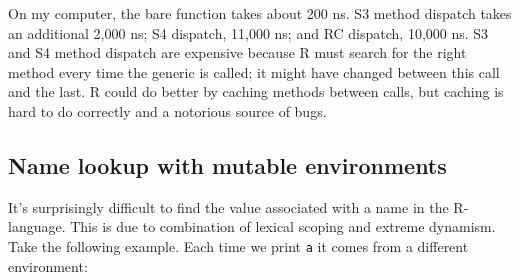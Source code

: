 \begin{Shaded}
\begin{Highlighting}[]
\NormalTok{(}
   \NormalTok{(),}
   
   
   \NormalTok{()}
\NormalTok{)}
\end{Highlighting}
\end{Shaded}

On my computer, the bare function takes about 200 ns. S3 method dispatch
takes an additional 2,000 ns; S4 dispatch, 11,000 ns; and RC dispatch,
10,000 ns. S3 and S4 method dispatch are expensive because R must search
for the right method every time the generic is called; it might have
changed between this call and the last. R could do better by caching
methods between calls, but caching is hard to do correctly and a
notorious source of bugs.

\subsection{Name lookup with mutable environments}

It's surprisingly difficult to find the value associated with a name in
the R-language. This is due to combination of lexical scoping and
extreme dynamism. Take the following example. Each time we print
\texttt{a} it comes from a different environment:

\begin{Shaded}
\begin{Highlighting}[]
\StringTok{ }
\StringTok{ }
  \StringTok{ }
    \NormalTok{(}\NormalTok{, }\NormalTok{, } \NormalTok{())}
    \StringTok{ }
  \NormalTok{\}}
  \NormalTok{()}
\NormalTok{\}}
\NormalTok{()}
\end{Highlighting}
\end{Shaded}

